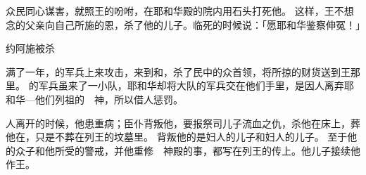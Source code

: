 {众民同心谋害{}，就照王的吩咐，在耶和华殿的院内用石头打死他。
这样，{}王不想念{}的父亲{}向自己所施的恩，杀了他的儿子。{}临死的时候说：「愿耶和华鉴察伸冤！」
\par }{\SH 约阿施被杀
\par }{\PP {}满了一年，{}的军兵上来攻击{}，来到{}和{}，杀了民中的众首领，将所掠的财货送到{}王那里。
的军兵虽来了一小队，耶和华却将大队的军兵交在他们手里，是因{}人离弃耶和华—他们列祖的　神，所以借{}人惩罚{}。
\par }{\PP {}人离开{}的时候，他患重病；臣仆背叛他，要报祭司{}儿子流血之仇，杀他在床上，葬他在{}，只是不葬在列王的坟墓里。
背叛他的是{}妇人{}的儿子{}和{}妇人{}的儿子{}。
至于他的众子和他所受的警戒，并他重修　神殿的事，都写在列王的传上。他儿子{}接续他作王。

}
